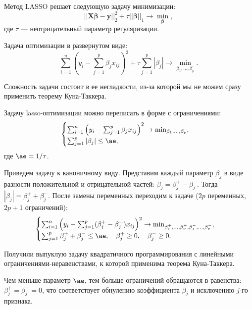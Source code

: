 \documentclass[12pt,a4paper,final]{article}
\newcommand{\1}{\mathds{1}}
\begin{document}
Метод LASSO решает следующую задачу минимизации:
\begin{equation*}
	||\bm{X} \bm \beta - \bm y||_{2}^{2}
	+
	\tau||\bm \beta||_{1}
	\rightarrow\min_{\bm \beta},
\end{equation*}
где $\tau$ --- неотрицательный параметр регуляризации.

Задача оптимизации в развернутом виде:
\begin{equation*}
	\sum_{i=1}^{n}
	\left(
	y_{i}
	-
	\sum_{j=1}^{p}\beta_{j}x_{ij}
	\right)^{2}
	+
	\tau\sum_{j=1}^{p}|\beta_{j}|
	\rightarrow\min_{\beta_{1},\ldots,\beta_{p}}.
\end{equation*}

Сложность задачи состоит в ее негладкости, из-за которой мы не можем сразу применить теорему Куна-Таккера.

Задачу lasso-оптимизации можно переписать в форме с ограничениями: %
\begin{equation*}
	\begin{cases}
		\sum_{i=1}^{n}
		\left(
		y_{i}
		-
		\sum_{j=1}^{p}\beta_{j}x_{ij}
		\right)^{2}
		\to
		\min_{\beta_{1},\ldots,\beta_{p}},\\
		\sum_{j=1}^{p}|\beta_{j}|\leq\ae,
	\end{cases}
\end{equation*}
где $\ae=1/\tau$.

Приведем задачу к каноничному виду. Представим каждый параметр $\beta_{j}$ в виде разности положительной и отрицательной частей: $\beta_{j}=\beta_{j}^{+}-\beta_{j}^{-}$. Тогда $|\beta_{j}|=\beta_{j}^{+}+\beta_{j}^{-}$. После замены переменных переходим к задаче 
($2p$ переменных, $2p+1$ ограничений):
\begin{equation*}
	\begin{cases}
		\sum_{i=1}^{n}
		\left(
		y_{i}
		-
		\sum_{j=1}^{p}(\beta_{j}^{+}-\beta_{j}^{-})x_{ij}
		\right)^{2}
		\to
		\min_{\beta_{1}^{+},\ldots,\beta_{p}^{+},\beta_{1}^{-},\ldots,\beta_{p}^{-}},\\
		\sum_{j=1}^{p}\beta_{j}^{+}+\beta_{j}^{-}\leq\ae,
		\quad
		\beta_{j}^{+}\geq 0,
		\quad
		\beta_{j}^{-}\geq 0.
	\end{cases}
\end{equation*}

Получили выпуклую задачу квадратичного программирования с линейными ограничениями-неравенствами, к которой применима теорема Куна-Таккера.

Чем меньше параметр $\ae$, тем больше ограничений обращаются в равенства: $\beta_{j}^{+}=\beta_{j}^{-}=0$, что соответствует обнулению коэффициента $\beta_{j}$ и исключению $j$-го признака.
\end{document}
